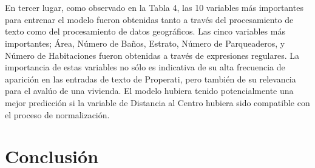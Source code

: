 \documentclass[article,11 pt]{article}
\begin{document}
\\
\\
En tercer lugar, como observado en la Tabla 4, las 10 variables más importantes para entrenar el modelo fueron obtenidas tanto a través del procesamiento de texto como del procesamiento de datos geográficos. Las cinco variables más importantes; Área, Número de Baños, Estrato, Número de Parqueaderos, y Número de Habitaciones fueron obtenidas a través de expresiones regulares. La importancia de estas variables no sólo es indicativa de su alta frecuencia de aparición en las entradas de texto de Properati, pero también de su relevancia para el avalúo de una vivienda. El modelo hubiera tenido potencialmente una mejor predicción si la variable de Distancia al Centro hubiera sido compatible con el proceso de normalización.



\section{Conclusión}
\end{document}
